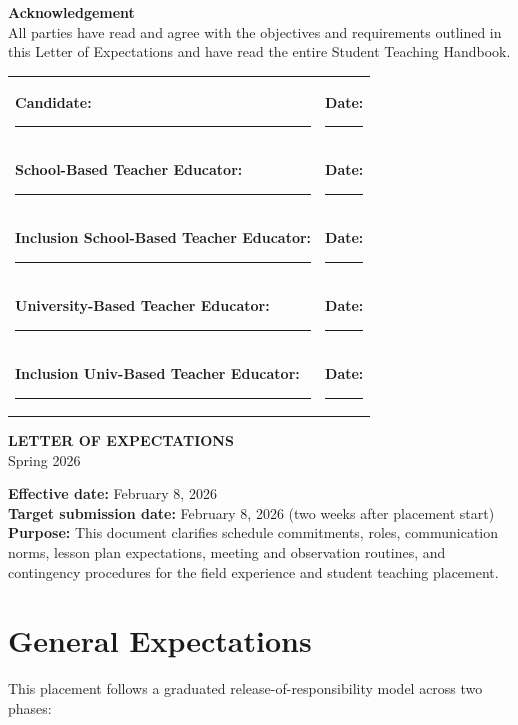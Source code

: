 \documentclass[10pt]{article}
\newcommand{\AcademicTerm}{Spring 2026}
\newcommand{\EffectiveDate}{February 8, 2026}
\newcommand{\TargetSubmissionDate}{February 8, 2026 (two weeks after placement start)}
\begin{document}
\textbf{Acknowledgement}\\
All parties have read and agree with the objectives and requirements outlined in this Letter of Expectations and have read the entire Student Teaching Handbook.

\vspace{1.25em}

\begin{tabular}{@{}p{}p{}@{}}
\textbf{Candidate:} \rule{0.78\textwidth}{0.4pt} & \textbf{Date:} \rule{0.10\textwidth}{0.4pt} \\
\textbf{School-Based Teacher Educator:} \rule{0.58\textwidth}{0.4pt} & \textbf{Date:} \rule{0.10\textwidth}{0.4pt} \\
\textbf{Inclusion School-Based Teacher Educator:} \rule{0.49\textwidth}{0.4pt} & \textbf{Date:} \rule{0.10\textwidth}{0.4pt} \\
\textbf{University-Based Teacher Educator:} \rule{0.54\textwidth}{0.4pt} & \textbf{Date:} \rule{0.10\textwidth}{0.4pt} \\
\textbf{Inclusion Univ-Based Teacher Educator:} \rule{0.50\textwidth}{0.4pt} & \textbf{Date:} \rule{0.10\textwidth}{0.4pt} \\
\end{tabular}

\newpage

\begin{center}
{\LARGE\bfseries LETTER OF EXPECTATIONS}\\[0.25em]
{\AcademicTerm}\\
\end{center}

\textbf{Effective date:} \EffectiveDate\\
\textbf{Target submission date:} \TargetSubmissionDate\\

\textbf{Purpose:} This document clarifies schedule commitments, roles, communication norms, lesson plan expectations, meeting and observation routines, and contingency procedures for the field experience and student teaching placement.

\section{General Expectations}
This placement follows a graduated release-of-responsibility model across two phases:
\end{document}
